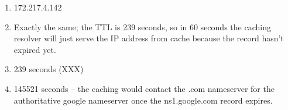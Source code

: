 \documentclass{report}
\begin{document}
\begin{problem}
\begin{enumerate}
\end{enumerate}


\begin{answer}{50em}
  \begin{enumerate}
  \item 172.217.4.142
  \item Exactly the same; the TTL is 239 seconds, so in 60 seconds the caching
        resolver will just serve the IP address from cache because the record
        hasn't expired yet.
  \item 239 seconds (XXX)
  \item 145521 seconds -- the caching would contact the .com nameserver for the
        authoritative google nameserver once the ns1.google.com record expires.
  \end{enumerate}
\end{answer}

\end{problem}
\end{document}
